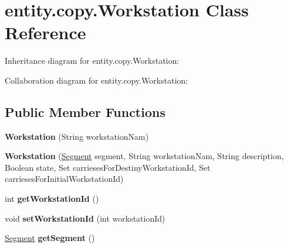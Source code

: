 \hypertarget{classentity_1_1copy_1_1_workstation}{}\section{entity.\+copy.\+Workstation Class Reference}
\label{classentity_1_1copy_1_1_workstation}


Inheritance diagram for entity.\+copy.\+Workstation\+:


Collaboration diagram for entity.\+copy.\+Workstation\+:
\subsection*{Public Member Functions}
\begin{DoxyCompactItemize}
\item 
\mbox{\label{classentity_1_1copy_1_1_workstation_a448c76d94800dcc1b179daf2856084ef}} 
{\bfseries Workstation} (String workstation\+Nam)
\item 
\mbox{\label{classentity_1_1copy_1_1_workstation_a0ae93ddf50a960b83e8b73f90a3b6405}} 
{\bfseries Workstation} (\mbox{\hyperlink{classentity_1_1copy_1_1_segment}{Segment}} segment, String workstation\+Nam, String description, Boolean state, Set carrieses\+For\+Destiny\+Workstation\+Id, Set carrieses\+For\+Initial\+Workstation\+Id)
\item 
\mbox{\label{classentity_1_1copy_1_1_workstation_abbdfa8113fbe3f99fe86961a9b94aac7}} 
int {\bfseries get\+Workstation\+Id} ()
\item 
\mbox{\label{classentity_1_1copy_1_1_workstation_a46c647486665990074a8426f66c9b175}} 
void {\bfseries set\+Workstation\+Id} (int workstation\+Id)
\item 
\mbox{\label{classentity_1_1copy_1_1_workstation_a3d829847163d15c627e8bc0c81a8537e}} 
\mbox{\hyperlink{classentity_1_1copy_1_1_segment}{Segment}} {\bfseries get\+Segment} ()
\item 
\mbox{\label{classentity_1_1copy_1_1_workstation_aa848584af51a84c21e2e7e9662a5391a}} 

\end{DoxyCompactItemize}
